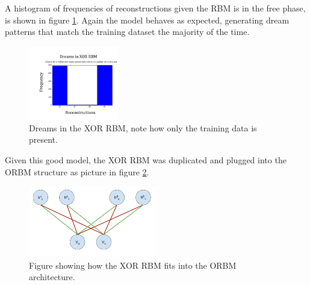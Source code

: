 A histogram of frequencies of reconstructions given the RBM is in the free phase, is shown in figure \ref{F:Two-Bit-RBM-Dreams}. Again the model behaves as expected, generating dream patterns that match the training dataset the majority of the time.
\begin{figure}
  \begin{center}
    \includegraphics[width=0.35\textwidth]{Assets/XOR-RBM-Dreams.png}
  \end{center}
  \caption{Dreams in the XOR RBM, note how only the training data is present.}
  \label{F:Two-Bit-RBM-Dreams}
\end{figure}
Given this good model, the XOR RBM was duplicated and plugged into the ORBM structure as picture in figure \ref{F:XOR-ORBM}.


\begin{figure}
  \begin{center}
    \includegraphics[width=0.5\textwidth]{Assets/XOR-ORBM.png}
  \end{center}
  \caption{Figure showing how the XOR RBM fits into the ORBM architecture.}
  \label{F:XOR-ORBM}
\end{figure}

